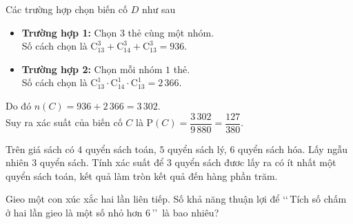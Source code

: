 \begin{ex}
{\begin{itemchoice}
			Các trường  hợp chọn biến cố $D$ như sau
			\begin{itemize}
				\item {\bf Trường hợp 1:} Chọn $3$  thẻ cùng một nhóm.\\
				Số  cách chọn là $\mathrm{C}_{13}^3+\mathrm{C}_{14}^3+\mathrm{C}_{13}^3=936$.
				\item {\bf Trường hợp  2:} Chọn mỗi nhóm $1$ thẻ.\\
				Số cách chọn là  $\mathrm{C}_{13}^1\cdot\mathrm{C}_{14}^1\cdot\mathrm{C}_{13}^1=2\,366$.
			\end{itemize}
			 Do đó $n(C)=936+2\,366=3\,302$.\\
			Suy ra xác suất của biến cố  $C$ là
			$\mathrm{P}(C)=\dfrac{3\,302}{9\,880}=\dfrac{127}{380}$. 
		\end{itemchoice}
	} 
\end{ex}



\begin{bt}%
	Trên giá sách có $4$ quyển  sách toán, $5$ quyển sách lý, $6$ quyển sách hóa. Lấy ngẫu nhiên $3$ quyển sách. Tính xác suất để $3$ quyển sách đươc lấy ra có ít nhất một quyển sách toán, kết quả làm tròn kết quả đến hàng phần trăm.
\end{bt}

\begin{bt}%
	Gieo  một con xúc xắc hai lần liên tiếp. Số khả năng thuận lợi để \lq\lq \,Tích số chấm ở hai lần gieo là một số nhỏ hơn $6$\,\rq\rq \ là bao nhiêu?
\end{bt}

